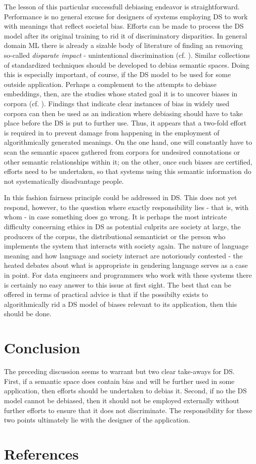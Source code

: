 \documentclass{article}
\begin{document}
The lesson of this particular successfull debiasing endeavor is straightforward. Performance is no general excuse for designers of systems employing DS to work with meanings that reflect societal bias. Efforts can be made to process the DS model after its original training to rid it of discriminatory disparities. In general domain ML there is already a sizable body of literature of finding an removing so-called \emph{disparate impact} - unintentional discrimination (cf. \cite{feldman2015certifying} \cite{dwork2012fairness}). 
Similar collections of standardized techniques should be developed to debias semantic spaces. Doing this is especially important, of course, if the DS model to be used for some outside application. 
Perhaps a complement to the attempts to debiase embeddings, then, are the studies whose stated goal it is to uncover biases in corpora (cf. \cite{wagner2015s} \cite{herbelot2012distributional}). Findings that indicate clear instances of bias in widely used corpora can then be used as an indication where  debiasing should have to take place before the DS is put to further use.
Thus, it appears that a two-fold effort is required in to prevent damage from happening in the employment of algorithmically generated meanings. On the one hand, one will constantly have to scan the semantic spaces gathered from corpora for undesired connotations or other semantic relationships within it; on the other, once such biases are certified, efforts need to be undertaken, so that systems using this semantic information do not systematically disadvantage people.

In this fashion fairness principle could be addressed in DS. This does not yet respond, however, to the question where exactly responsibility lies - that is, with whom - in case something does go wrong.
It is perhaps the most intricate difficulty concerning ethics in DS as potential culprits are society at large, the producers of the corpus, the distributional semanticist or the person who implements the system that interacts with society again. 
The nature of language meaning and how language and society interact are notoriously contested - the heated debates about what is appropriate in gendering language serves as a case in point. For data engineers and programmers who work with these systems there is certainly no easy answer to this issue at first sight.
The best that can be offered in terms of practical advice is that if the possibilty exists to algorithmically rid a DS model of biases relevant to its application, then this should be done.
\section{Conclusion}\hypertarget{sec5}{}
The preceding discussion seems to warrant but two clear take-aways for DS. First, if a semantic space does contain bias and will be further used in some application, then efforts should be undertaken to debias it. Second, if no the DS model cannot be debiased, then it should not be employed externally without further efforts to ensure that it does not discriminate. The responsibility for these two points ultimately lie with the designer of the application.
\section{References}\hypertarget{sec6}{ }
\printbibliography
\end{document}
